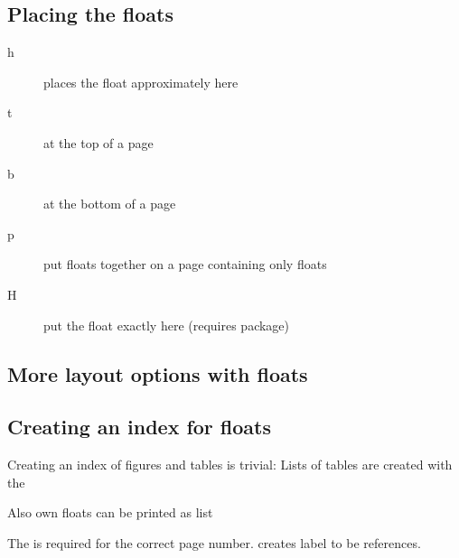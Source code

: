 \subsection{Placing the floats}
\begin{frame}

	\begin{description}
		\item[h] places the float approximately here
		\item[t] at the top of a page
		\item[b] at the bottom of a page
		\item[p] put floats together on a page containing only floats
		\item[H] put the float exactly here (requires  package)
	\end{description}
\end{frame}
\subsection{More layout options with floats}
\begin{frame}
\end{frame}
\begin{frame}
\end{frame}
\begin{frame}
\end{frame}

\subsection{Creating an index for floats}
\begin{frame}
	Creating an index of figures and tables is trivial:
	Lists of tables are created with the 
\end{frame}
\begin{frame}
	Also own floats can be printed as list
\end{frame}
\begin{frame}[plain]
	The  is required for the correct page number.
	 creates label to be references.
\end{frame}


